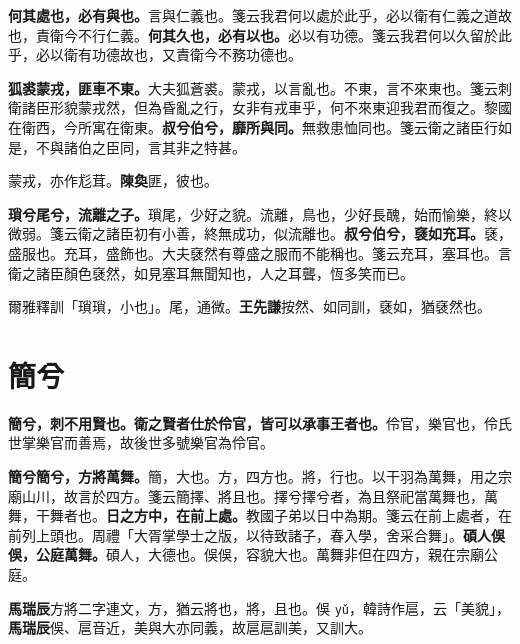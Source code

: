 \textbf{何其處也，必有與也。}{\footnotesize 言與仁義也。箋云我君何以處於此乎，必以衛有仁義之道故也，責衛今不行仁義。}\textbf{何其久也，必有以也。}{\footnotesize 必以有功德。箋云我君何以久留於此乎，必以衛有功德故也，又責衛今不務功德也。}

\textbf{狐裘蒙戎，匪車不東。}{\footnotesize 大夫狐蒼裘。蒙戎，以言亂也。不東，言不來東也。箋云刺衛諸臣形貌蒙戎然，但為昏亂之行，女非有戎車乎，何不來東迎我君而復之。黎國在衛西，今所寓在衛東。}\textbf{叔兮伯兮，靡所與同。}{\footnotesize 無救患恤同也。箋云衛之諸臣行如是，不與諸伯之臣同，言其非之特甚。}

\begin{quoting}蒙戎，亦作尨茸。\textbf{陳奐}匪，彼也。\end{quoting}

\textbf{瑣兮尾兮，流離之子。}{\footnotesize 瑣尾，少好之貌。流離，鳥也，少好長醜，始而愉樂，終以微弱。箋云衛之諸臣初有小善，終無成功，似流離也。}\textbf{叔兮伯兮，褎如充耳。}{\footnotesize 褎，盛服也。充耳，盛飾也。大夫褎然有尊盛之服而不能稱也。箋云充耳，塞耳也。言衛之諸臣顏色褎然，如見塞耳無聞知也，人之耳聾，恆多笑而已。}

\begin{quoting}爾雅釋訓「瑣瑣，小也」。尾，通微。\textbf{王先謙}按然、如同訓，褎如，猶褎然也。\end{quoting}

\section{簡兮}


\textbf{簡兮，刺不用賢也。衛之賢者仕於伶官，皆可以承事王者也。}{\footnotesize 伶官，樂官也，伶氏世掌樂官而善焉，故後世多號樂官為伶官。}

\textbf{簡兮簡兮，方將萬舞。}{\footnotesize 簡，大也。方，四方也。將，行也。以干羽為萬舞，用之宗廟山川，故言於四方。箋云簡擇、將且也。擇兮擇兮者，為且祭祀當萬舞也，萬舞，干舞者也。}\textbf{日之方中，在前上處。}{\footnotesize 教國子弟以日中為期。箋云在前上處者，在前列上頭也。周禮「大胥掌學士之版，以待致諸子，春入學，舍采合舞」。}\textbf{碩人俁俁，公庭萬舞。}{\footnotesize 碩人，大德也。俁俁，容貌大也。萬舞非但在四方，親在宗廟公庭。}

\begin{quoting}\textbf{馬瑞辰}方將二字連文，方，猶云將也，將，且也。俁 \texttt{yǔ}，韓詩作扈，云「美貌」，\textbf{馬瑞辰}俁、扈音近，美與大亦同義，故扈扈訓美，又訓大。\end{quoting}

